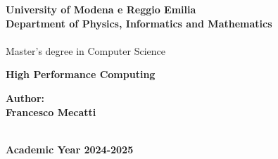 \documentclass[12pt,a4paper,twoside,onecolumn,openright]{book}
\begin{document}
\begin{sloppypar}

\begin{titlepage}
\begin{center} {
    \large
    \textbf{University of Modena e Reggio Emilia} \\
     \textbf{Department of Physics, Informatics and Mathematics} \\
    \hspace*{0cm} \hrulefill \hspace*{0cm} \\
    Master's degree in Computer Science
    
    \begin{spacing}{1}
        \huge{\bf High Performance Computing}
    \end{spacing}
}
\vspace{3mm}
\end{center}

\vspace{40mm}
\par
\noindent
\hfill
\begin{minipage}[t]{0.47\textwidth}\raggedleft
{\large{\bf Author:\\ Francesco Mecatti}}
\end{minipage}
\vspace{10mm}

\begin{center}
\hspace*{0cm} \hrulefill \hspace*{0cm} \\
\vspace{5mm}
{\large{\bf Academic Year 2024-2025}}
\end{center}
\end{titlepage}

\setlength{\parindent}{0pt}
\setlength{\parskip}{1ex plus 0.5ex minus 0.2ex}
\frontmatter
\mainmatter

\newcommand{\whitepage}{\hbox{}\thispagestyle{empty}\newpage}

\renewcommand{\contentsname}{Table of Contents} \tableofcontents


\end{sloppypar}
\end{document}
